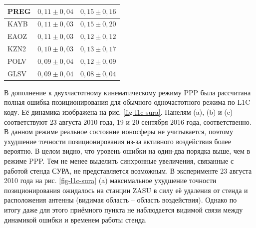 \begin{longtable}{|>{\centering\arraybackslash}m{4cm}|c|c|}
PREG    & $0,11\pm0,04$                                                                                       & $0,15\pm0,16$                                                                                    \\ \hline
KAYB    & $0,11\pm0,03$                                                                                       & $0,15\pm0,20$                                                                                    \\ \hline
EAOZ    & $0,11\pm0,03$                                                                                       & $0,12\pm0,12$                                                                                    \\ \hline
KZN2    & $0,10\pm0,03$                                                                                       & $0,13\pm0,17$                                                                                    \\ \hline
POLV    & $0,09\pm0,04$                                                                                       & $0,12\pm0,09$                                                                                    \\ \hline
GLSV    & $0,09\pm0,04$                                                                                       & $0,08\pm0,04$                                                                                    \\ \hline
\end{longtable}
\endgroup

В дополнение к двухчастотному кинематическому режиму PPP была рассчитана полная ошибка позиционирования для обычного одночастотного режима по L1C коду. 
Её динамика изображена на рис. \ref{fig-l1c-sura}.
Панелям (a), (b) и (c) соответствуют 23 августа 2010 года, 19 и 20 сентября 2016 года, соответственно.
В данном режиме реальное состояние ионосферы не учитывается, поэтому ухудшение точности позиционирования из-за активного воздействия более вероятно. 
В целом видно, что уровень ошибки на один-два порядка выше, чем в режиме PPP.
Тем не менее выделить синхронные увеличения, связанные с работой стенда СУРА, не представляется возможным. 
В эксперименте 23 августа 2010 года на рис. \ref{fig-l1c-sura} (a) максимальное ухудшение точности позиционирования ожидалось на станции ZASU в силу её удаления от стенда и расположения антенны (видимая область -- область воздействия).
Однако по итогу даже для этого приёмного пункта не наблюдается видимой связи между динамикой ошибки и временем работы стенда.

